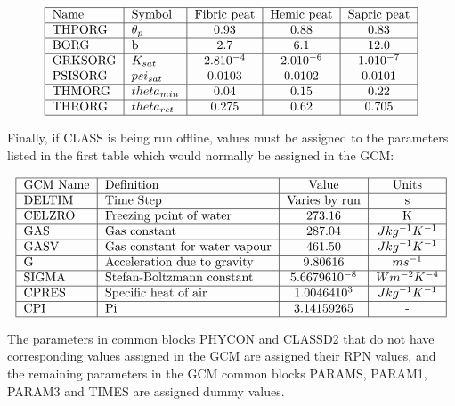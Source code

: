 \[ \begin{tabular} { | l | l | c | c | c | } \hline Name & Symbol & Fibric peat & Hemic peat & Sapric peat \\ \hline THPORG & $\theta_p $ & 0.93 & 0.88 & 0.83 \\ \hline BORG & b & 2.7 & 6.1 & 12.0 \\ \hline GRKSORG & $K_{sat} $ & $2.8 10^{-4}$ & $2.0 10^{-6}$ & $1.0 10^{-7}$ \\ \hline PSISORG & $psi_{sat} $ & 0.0103 & 0.0102 & 0.0101 \\ \hline THMORG & $theta_{min}$ & 0.04 & 0.15 & 0.22 \\ \hline THRORG & $theta_{ret}$ & 0.275 & 0.62 & 0.705 \\ \hline \end{tabular} \]

Finally, if C\+L\+A\+S\+S is being run offline, values must be assigned to the parameters listed in the first table which would normally be assigned in the G\+C\+M\+:

\[ \begin{tabular} { | l | l | c | c | } \hline GCM Name & Definition & Value & Units \\ \hline DELTIM & Time Step & Varies by run & s \\ \hline CELZRO & Freezing point of water & 273.16 & K \\ \hline GAS & Gas constant & 287.04 & $J kg^{-1} K^{-1}$ \\ \hline GASV & Gas constant for water vapour & 461.50 & $J kg^{-1} K^{-1}$ \\ \hline G & Acceleration due to gravity & 9.80616 & $m s^{-1} $ \\ \hline SIGMA & Stefan-Boltzmann constant & $5.66796 10^{-8}$ & $W m^{-2} K^{-4} $ \\ \hline CPRES & Specific heat of air & $1.00464 10^3 $ & $J kg^{-1} K^{-1}$ \\ \hline CPI & Pi & 3.14159265 & - \\ \hline \end{tabular} \]

The parameters in common blocks P\+H\+Y\+C\+O\+N and C\+L\+A\+S\+S\+D2 that do not have corresponding values assigned in the G\+C\+M are assigned their R\+P\+N values, and the remaining parameters in the G\+C\+M common blocks P\+A\+R\+A\+M\+S, P\+A\+R\+A\+M1, P\+A\+R\+A\+M3 and T\+I\+M\+E\+S are assigned dummy values. 